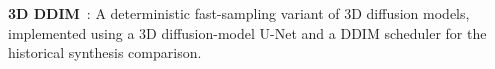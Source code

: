 \item \textbf{3D DDIM}~\cite{song2021ddim,pinaya2023generative}: A deterministic fast-sampling variant of 3D diffusion models, implemented using a 3D diffusion-model U-Net and a DDIM scheduler for the historical synthesis comparison.
